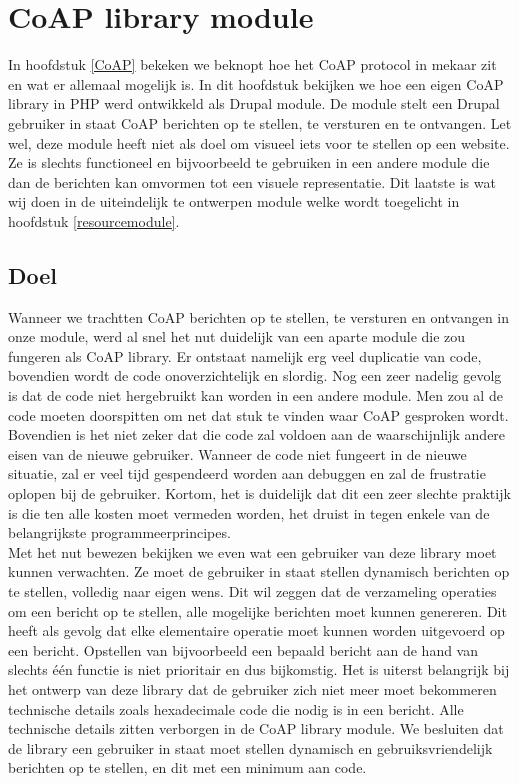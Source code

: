 \chapter{CoAP library module} \label{coaplibrary}

In hoofdstuk \ref{CoAP} bekeken we beknopt hoe het CoAP protocol in mekaar zit en wat er allemaal mogelijk is. In dit hoofdstuk bekijken we hoe een eigen CoAP library in PHP werd ontwikkeld als Drupal module. De module stelt een Drupal gebruiker in staat CoAP berichten op te stellen, te versturen en te ontvangen. Let wel, deze module heeft niet als doel om visueel iets voor te stellen op een website. Ze is slechts functioneel en bijvoorbeeld te gebruiken in een andere module die dan de berichten kan omvormen tot een visuele representatie. Dit laatste is wat wij doen in de uiteindelijk te ontwerpen module welke wordt toegelicht in hoofdstuk \ref{resourcemodule}.

\section{Doel}

Wanneer we trachtten CoAP berichten op te stellen, te versturen en ontvangen in onze module, werd al snel het nut duidelijk van een aparte module die zou fungeren als CoAP library. Er ontstaat namelijk erg veel duplicatie van code, bovendien wordt de code onoverzichtelijk en slordig. Nog een zeer nadelig gevolg is dat de code niet hergebruikt kan worden in een andere module. Men zou al de code moeten doorspitten om net dat stuk te vinden waar CoAP gesproken wordt. Bovendien is het niet zeker dat die code zal voldoen aan de waarschijnlijk andere eisen van de nieuwe gebruiker. Wanneer de code niet fungeert in de nieuwe situatie, zal er veel tijd gespendeerd worden aan debuggen en zal de frustratie oplopen bij de gebruiker. Kortom, het is duidelijk dat dit een zeer slechte praktijk is die ten alle kosten moet vermeden worden, het druist in tegen enkele van de belangrijkste programmeerprincipes.\\

Met het nut bewezen bekijken we even wat een gebruiker van deze library moet kunnen verwachten. Ze moet de gebruiker in staat stellen dynamisch berichten op te stellen, volledig naar eigen wens. Dit wil zeggen dat de verzameling operaties om een bericht op te stellen, alle mogelijke berichten moet kunnen genereren. Dit heeft als gevolg dat elke elementaire operatie moet kunnen worden uitgevoerd op een bericht. Opstellen van bijvoorbeeld een bepaald bericht aan de hand van slechts één functie is niet prioritair en dus bijkomstig. Het is uiterst belangrijk bij het ontwerp van deze library dat de gebruiker zich niet meer moet bekommeren technische details zoals hexadecimale code die nodig is in een bericht. Alle technische details zitten verborgen in de CoAP library module. We besluiten dat de library een gebruiker in staat moet stellen dynamisch en gebruiksvriendelijk berichten op te stellen, en dit met een minimum aan code.


